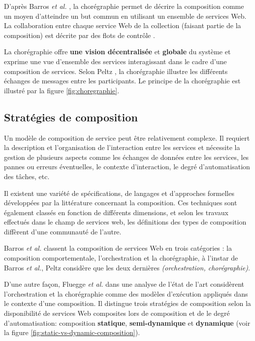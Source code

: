     D'après Barros \emph{et al.} \cite{barros2006standards}, la
    chorégraphie permet de décrire la composition comme un moyen
    d'atteindre un but commun en utilisant un ensemble de services
    Web. La collaboration entre chaque service Web de la collection
    (faisant partie de la composition) est décrite par des flots de
    contrôle \cite{lopez2008selection}.\medskip

    La chorégraphie offre \textbf{une vision décentralisée} et
    \textbf{globale} du système et exprime une vue d'ensemble des
    services interagissant dans le cadre d'une composition de
    services. Selon Peltz \cite{peltz2003web}, la chorégraphie
    illustre les différents échanges de messages entre les
    participants. Le principe de la chorégraphie est illustré par la
    figure \ref{fig:choregraphie}.

  \subsection{Stratégies de composition}
  \label{sec:types-de-composition}
  Un modèle de composition de service peut être relativement
  complexe. Il requiert la description et l'organisation de
  l'interaction entre les services et nécessite la gestion de
  plusieurs aspects comme les échanges de données entre les services,
  les pannes ou erreurs éventuelles, le contexte d'interaction, le
  degré d'automatisation des tâches, etc.\medskip

  Il existent une variété de spécifications, de langages et
  d'approches formelles développées par la littérature concernant la
  composition. Ces techniques sont également classés en fonction de
  différents dimensions, et selon les travaux effectués dans le champ
  de services web, les définitions des types de composition diffèrent
  d'une communauté de l'autre.\medskip

  Barros \emph{et al.} \cite{barros2006standards} classent la
  composition de services Web en trois catégories : la composition
  comportementale, l'orchestration et la chorégraphie, à l'instar de
  Barros \emph{et al.}, Peltz \cite{peltz2003web} considère que les
  deux dernières \textit{(orchestration, chorégraphie)}.\medskip

  

  D'une autre façon, Fluegge \emph{et al.}\cite{fluegge2006challenges}
  dans une analyse de l'état de l'art considèrent l'orchestration et
  la chorégraphie comme des modèles d'exécution appliqués dans le
  contexte d'une composition. Il distingue trois stratégies de
  composition selon la disponibilité de services Web composites lors
  de composition et de le degré d'automatisation: composition
  \textbf{statique}, \textbf{semi-dynamique} et \textbf{dynamique}
  (voir la figure \ref{fig:static-vs-dynamic-composition}).

